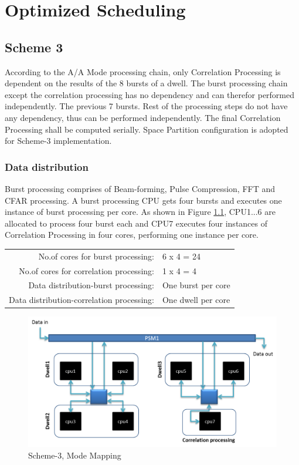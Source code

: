 \chapter{Optimized Scheduling}
\label{chap:mode_mapping}

\section{Scheme 3}
\label{sec:mm:scheme4}
According to the A/A Mode processing chain, only Correlation Processing is dependent on the results of the 8 bursts of a dwell. The burst processing chain except the correlation processing has no dependency and can therefor performed independently. The previous 7 bursts. Rest of the processing steps do not have any dependency, thus can be performed independently. The final Correlation Processing shall be computed serially. Space Partition configuration is adopted for Scheme-3 implementation.

\subsection{Data distribution}
Burst processing comprises of Beam-forming, Pulse Compression, FFT and CFAR processing. A burst processing CPU gets four bursts and executes one instance of burst processing per core. As shown in Figure \ref{fig:mm:scheme4_aa_mode_mapping}, CPU1...6 are allocated to process four burst each and CPU7 executes four instances of Correlation Processing in four cores, performing one instance per core.

\begin{tabular}{rl}
	No.of cores for burst processing: & 6 x 4 = 24 \\
	No.of cores for correlation processing: & 1 x 4 = 4 \\
	Data distribution-burst processing: & One burst per core \\
	Data distribution-correlation processing: & One dwell per core \\
\end{tabular}

\begin{figure}[h!]
	\centering
	\includegraphics[width=140mm]{figures/scheme4_aa_mode_mapping}
	\caption{Scheme-3, Mode Mapping}
	\label{fig:mm:scheme4_aa_mode_mapping}
\end{figure}

